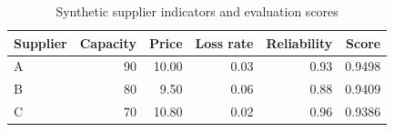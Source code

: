 \begin{table}[H]
\centering
\caption{Synthetic supplier indicators and evaluation scores}
\label{tab:demo-v1-supplier-scores}
\begin{tabular}{lrrrrr}
\toprule
Supplier & Capacity & Price & Loss rate & Reliability & Score \\
\midrule
A & 90 & 10.00 & 0.03 & 0.93 & 0.9498 \\
B & 80 & 9.50 & 0.06 & 0.88 & 0.9409 \\
C & 70 & 10.80 & 0.02 & 0.96 & 0.9386 \\
\bottomrule
\end{tabular}
\end{table}
